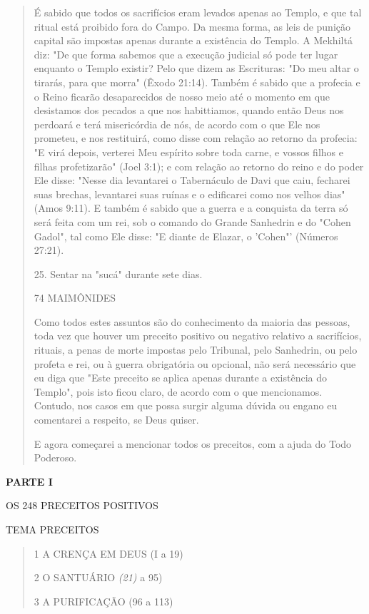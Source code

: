 \begin{quote}
É sabido que todos os sacrifícios eram levados apenas ao Templo, e que
tal ritual está proibido fora do Campo. Da mesma forma, as leis de
puni­ção capital são impostas apenas durante a existência do Templo. A
Mekhiltá diz: "De que forma sabemos que a execução judicial só pode ter
lugar enquanto o Templo existir? Pelo que dizem as Escrituras: "Do meu
altar o tirarás, para que morra" (Êxodo 21:14). Também é sabido que a
profecia e o Reino ficarão desaparecidos de nosso meio até o momento em
que desistamos dos pecados a que nos habittiamos, quando então Deus nos
perdoará e terá misericórdia de nós, de acordo com o que Ele nos
prometeu, e nos restituirá, como disse com relação ao retorno da
profecia: "E virá depois, verterei Meu espírito sobre toda carne, e
vossos filhos e filhas profetizarão" (Joel 3:1); e com relação ao
retorno do reino e do poder Ele disse: "Nesse dia levantarei o
Tabernáculo de Davi que caiu, fecharei suas brechas, levantarei suas
ruínas e o edificarei como nos ve­lhos dias" (Amos 9:11). E também é
sabido que a guerra e a conquista da terra só será feita com um rei, sob
o comando do Grande Sanhedrin e do "Cohen Gadol", tal como Ele disse: "E
diante de Elazar, o 'Cohen"' (Números 27:21).

25. Sentar na "sucá" durante sete dias.

74 MAIMÔNIDES

Como todos estes assuntos são do conhecimento da maioria das pes­soas,
toda vez que houver um preceito positivo ou negativo relativo a
sacrifí­cios, rituais, a penas de morte impostas pelo Tribunal, pelo
Sanhedrin, ou pelo profeta e rei, ou à guerra obrigatória ou opcional,
não será necessário que eu diga que "Este preceito se aplica apenas
durante a existência do Templo", pois isto ficou claro, de acordo com o
que mencionamos. Contudo, nos casos em que possa surgir alguma dúvida ou
engano eu comentarei a respeito, se Deus quiser.

E agora começarei a mencionar todos os preceitos, com a ajuda do Todo
Poderoso.
\end{quote}

\textbf{PARTE I}

OS 248 PRECEITOS POSITIVOS

TEMA PRECEITOS

\begin{quote}
1 A CRENÇA EM DEUS (I a 19)

2 O SANTUÁRIO \emph{(21)} a 95)

3 A PURIFICAÇÃO (96 a 113)
\end{quote}

